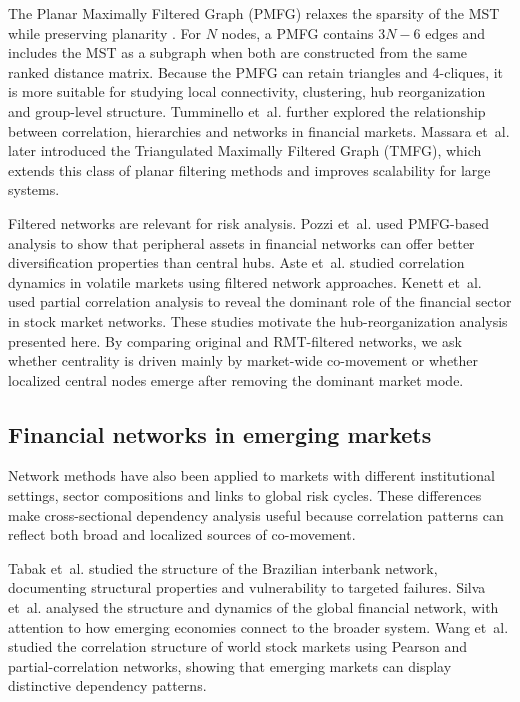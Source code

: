 The Planar Maximally Filtered Graph (PMFG) relaxes the sparsity of the MST while preserving planarity \cite{tumminello_2005_tool}. For $N$ nodes, a PMFG contains $3N-6$ edges and includes the MST as a subgraph when both are constructed from the same ranked distance matrix. Because the PMFG can retain triangles and 4-cliques, it is more suitable for studying local connectivity, clustering, hub reorganization and group-level structure. Tumminello et~al. \cite{tumminello_2010_correlation} further explored the relationship between correlation, hierarchies and networks in financial markets. Massara et~al. \cite{massara_2016_tmfg} later introduced the Triangulated Maximally Filtered Graph (TMFG), which extends this class of planar filtering methods and improves scalability for large systems.

Filtered networks are relevant for risk analysis. Pozzi et~al. \cite{pozzi_2013_spread} used PMFG-based analysis to show that peripheral assets in financial networks can offer better diversification properties than central hubs. Aste et~al. \cite{aste_2010_correlation} studied correlation dynamics in volatile markets using filtered network approaches. Kenett et~al. \cite{kenett_2012_dominating} used partial correlation analysis to reveal the dominant role of the financial sector in stock market networks. These studies motivate the hub-reorganization analysis presented here. By comparing original and RMT-filtered networks, we ask whether centrality is driven mainly by market-wide co-movement or whether localized central nodes emerge after removing the dominant market mode.

\subsection{Financial networks in emerging markets}

Network methods have also been applied to markets with different institutional settings, sector compositions and links to global risk cycles. These differences make cross-sectional dependency analysis useful because correlation patterns can reflect both broad and localized sources of co-movement.

Tabak et~al. \cite{tabak_2010_topology} studied the structure of the Brazilian interbank network, documenting structural properties and vulnerability to targeted failures. Silva et~al. \cite{silva_2016_structure} analysed the structure and dynamics of the global financial network, with attention to how emerging economies connect to the broader system. Wang et~al. \cite{wang_2018_correlation} studied the correlation structure of world stock markets using Pearson and partial-correlation networks, showing that emerging markets can display distinctive dependency patterns.

